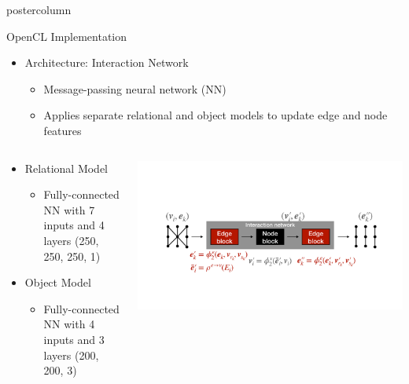 \documentclass[final,hyperref={pdfpagelabels=false}]{beamer}
\begin{document}
\begin{frame}
\begin{columns}
\begin{column}{.49\textwidth}
\begin{beamercolorbox}[center,wd=\textwidth]{postercolumn}
\begin{minipage}[T]{.95\textwidth}
{            \begin{block}{OpenCL Implementation}
              \begin{itemize}
                \item Architecture: Interaction Network
                \begin{itemize}
                  \item Message-passing neural network (NN)
                  \item Applies separate relational and object models to update edge and node features
                \end{itemize}
              \end{itemize}
              \begin{columns}              
              \begin{column}{.49\textwidth}
                \begin{itemize}
                  \item Relational Model
                  \begin{itemize}
                    \item Fully-connected NN with 7 inputs and 4 layers (250, 250, 250, 1)
                  \end{itemize}
                  \item Object Model
                  \begin{itemize}
                    \item Fully-connected NN with 4 inputs and 3 layers (200, 200, 3)
                  \end{itemize}
                \end{itemize}
              \end{column}
            \begin{column}{.49\textwidth}
             \begin{center}
                    \includegraphics[width=0.9\linewidth]{figures/OpenCL_GNN.pdf}
                  \end{center}
                \end{column}
                \end{columns}
              \end{block}
              
}
\end{minipage}
\end{beamercolorbox}
\end{column}
\end{columns}
\end{frame}
\end{document}

